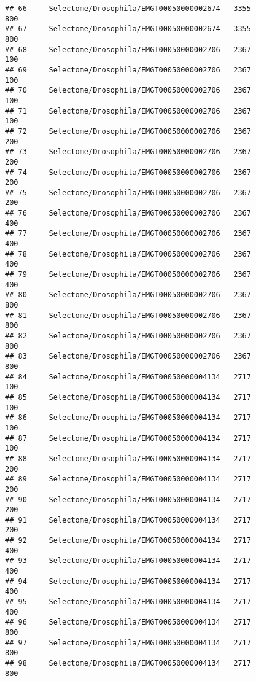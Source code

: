 \documentclass[
]{article}
\begin{document}
\begin{verbatim}
## 66     Selectome/Drosophila/EMGT00050000002674   3355                   800
## 67     Selectome/Drosophila/EMGT00050000002674   3355                   800
## 68     Selectome/Drosophila/EMGT00050000002706   2367                   100
## 69     Selectome/Drosophila/EMGT00050000002706   2367                   100
## 70     Selectome/Drosophila/EMGT00050000002706   2367                   100
## 71     Selectome/Drosophila/EMGT00050000002706   2367                   100
## 72     Selectome/Drosophila/EMGT00050000002706   2367                   200
## 73     Selectome/Drosophila/EMGT00050000002706   2367                   200
## 74     Selectome/Drosophila/EMGT00050000002706   2367                   200
## 75     Selectome/Drosophila/EMGT00050000002706   2367                   200
## 76     Selectome/Drosophila/EMGT00050000002706   2367                   400
## 77     Selectome/Drosophila/EMGT00050000002706   2367                   400
## 78     Selectome/Drosophila/EMGT00050000002706   2367                   400
## 79     Selectome/Drosophila/EMGT00050000002706   2367                   400
## 80     Selectome/Drosophila/EMGT00050000002706   2367                   800
## 81     Selectome/Drosophila/EMGT00050000002706   2367                   800
## 82     Selectome/Drosophila/EMGT00050000002706   2367                   800
## 83     Selectome/Drosophila/EMGT00050000002706   2367                   800
## 84     Selectome/Drosophila/EMGT00050000004134   2717                   100
## 85     Selectome/Drosophila/EMGT00050000004134   2717                   100
## 86     Selectome/Drosophila/EMGT00050000004134   2717                   100
## 87     Selectome/Drosophila/EMGT00050000004134   2717                   100
## 88     Selectome/Drosophila/EMGT00050000004134   2717                   200
## 89     Selectome/Drosophila/EMGT00050000004134   2717                   200
## 90     Selectome/Drosophila/EMGT00050000004134   2717                   200
## 91     Selectome/Drosophila/EMGT00050000004134   2717                   200
## 92     Selectome/Drosophila/EMGT00050000004134   2717                   400
## 93     Selectome/Drosophila/EMGT00050000004134   2717                   400
## 94     Selectome/Drosophila/EMGT00050000004134   2717                   400
## 95     Selectome/Drosophila/EMGT00050000004134   2717                   400
## 96     Selectome/Drosophila/EMGT00050000004134   2717                   800
## 97     Selectome/Drosophila/EMGT00050000004134   2717                   800
## 98     Selectome/Drosophila/EMGT00050000004134   2717                   800

\end{verbatim}
\end{document}
